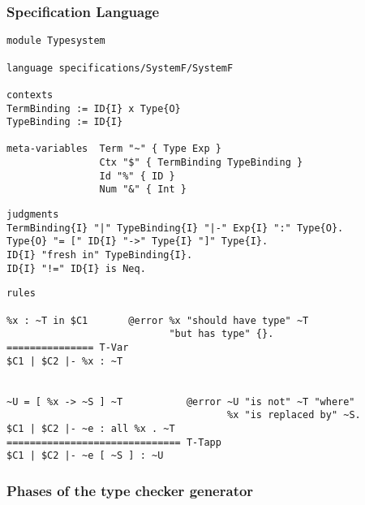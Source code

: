 \documentclass{beamer}
\begin{document}
\begin{frame}
  \frametitle{Specification Language}
\begin{lstlisting}[language=sltc]
module Typesystem

language specifications/SystemF/SystemF

contexts
TermBinding := ID{I} x Type{O}
TypeBinding := ID{I}

meta-variables 	Term "~" { Type Exp }
                Ctx "$" { TermBinding TypeBinding }
                Id "%" { ID }
                Num "&" { Int }
\end{lstlisting}
\framebreak{}
\begin{lstlisting}[language=sltc]
judgments
TermBinding{I} "|" TypeBinding{I} "|-" Exp{I} ":" Type{O}.
Type{O} "= [" ID{I} "->" Type{I} "]" Type{I}.
ID{I} "fresh in" TypeBinding{I}.
ID{I} "!=" ID{I} is Neq.
\end{lstlisting}
\framebreak{}
\small
\begin{lstlisting}[language=sltc]
rules

%x : ~T in $C1       @error %x "should have type" ~T
                            "but has type" {}.
=============== T-Var
$C1 | $C2 |- %x : ~T


~U = [ %x -> ~S ] ~T           @error ~U "is not" ~T "where"
                                      %x "is replaced by" ~S.
$C1 | $C2 |- ~e : all %x . ~T
============================== T-Tapp
$C1 | $C2 |- ~e [ ~S ] : ~U
\end{lstlisting}
\end{frame}

\newcommand*\selectTemplateGeneration{}
\newcommand*\selectTemplateOptimization{}
\newcommand*\selectConstraintGeneration{}
\newcommand*\selectConstraintSolving{}
\begin{frame}[label=overview]
  \frametitle{Phases of the type checker generator}
\begin{figure}
\label{fig:phases}
\end{figure}
\end{frame}
\end{document}
